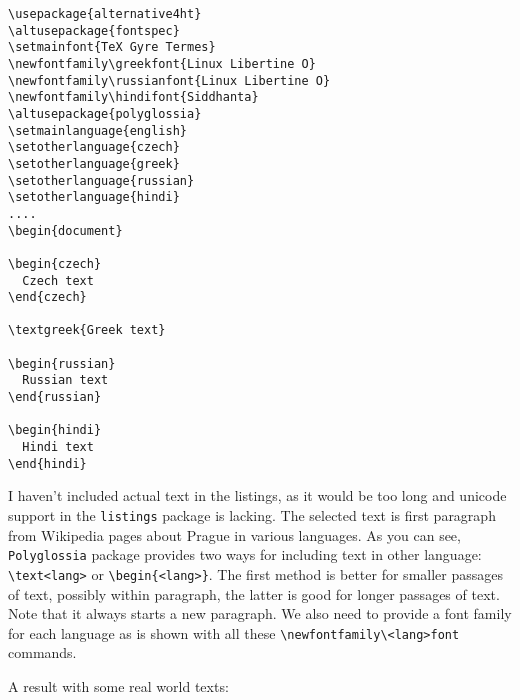 \documentclass{article}
\begin{document}
\begin{lstlisting}[language=Tex,extendedchars=true]
\usepackage{alternative4ht}
\altusepackage{fontspec}
\setmainfont{TeX Gyre Termes}
\newfontfamily\greekfont{Linux Libertine O}
\newfontfamily\russianfont{Linux Libertine O}
\newfontfamily\hindifont{Siddhanta}
\altusepackage{polyglossia}
\setmainlanguage{english}
\setotherlanguage{czech}
\setotherlanguage{greek}
\setotherlanguage{russian}
\setotherlanguage{hindi}
....
\begin{document}

\begin{czech}
  Czech text
\end{czech}

\textgreek{Greek text}

\begin{russian}
  Russian text
\end{russian}

\begin{hindi}
  Hindi text
\end{hindi}

\end{lstlisting}

I haven't included actual text in the listings, as it would be too long and
unicode support in the \texttt{listings} package is lacking. The selected text
is first paragraph from Wikipedia pages about Prague in various languages. As
you can see, \texttt{Polyglossia} package provides two ways for including text
in other language: \verb|\text<lang>| or \verb|\begin{<lang>}|.
  The first method is better for smaller passages of text, possibly within
  paragraph, the latter is good for longer passages of text. Note that it
  always starts a new paragraph. We also need to provide a font family for each language as is shown with all these \verb|\newfontfamily\<lang>font| commands.

A result with some real world texts:
\end{document}
